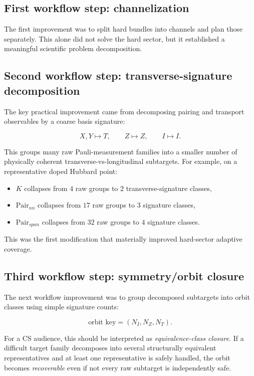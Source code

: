 \documentclass[11pt]{article}
\begin{document}
\subsection{First workflow step: channelization}

The first improvement was to split hard bundles into channels and plan those separately. This alone did not solve the hard sector, but it established a meaningful scientific problem decomposition.

\subsection{Second workflow step: transverse-signature decomposition}

The key practical improvement came from decomposing pairing and transport observables by a coarse basis signature:

\[
X,Y \mapsto T,\qquad Z\mapsto Z,\qquad I\mapsto I.
\]

This groups many raw Pauli-measurement families into a smaller number of physically coherent transverse-vs-longitudinal subtargets. For example, on a representative doped Hubbard point:

\begin{itemize}
\item \(K\) collapses from \(4\) raw groups to \(2\) transverse-signature classes,
\item \(\mathrm{Pair}_{nn}\) collapses from \(17\) raw groups to \(3\) signature classes,
\item \(\mathrm{Pair}_{span}\) collapses from \(32\) raw groups to \(4\) signature classes.
\end{itemize}

This was the first modification that materially improved hard-sector adaptive coverage.

\subsection{Third workflow step: symmetry/orbit closure}

The next workflow improvement was to group decomposed subtargets into orbit classes using simple signature counts:

\[
\text{orbit key} = (N_I, N_Z, N_T).
\]

For a CS audience, this should be interpreted as \emph{equivalence-class closure}. If a difficult target family decomposes into several structurally equivalent representatives and at least one representative is safely handled, the orbit becomes \emph{recoverable} even if not every raw subtarget is independently safe.
\end{document}
